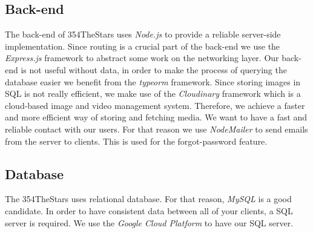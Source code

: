 \documentclass[11pt]{article}
\newcounter{use case ID}
\newcounter{req ID}
\begin{document}
    \subsection{Back-end}
        The back-end of 354TheStars uses \textit{Node.js} to provide a reliable server-side implementation. Since routing is a crucial part of the back-end we use the \textit{Express.js} framework to abstract some work on the networking layer. 
        Our back-end is not useful without data, in order to make the process of querying the database easier we benefit from the \textit{typeorm} framework.
        Since storing images in SQL is not really efficient, we make use of the \textit{Cloudinary} framework which is a cloud-based image and video management system. Therefore, we achieve a faster and more efficient way of storing and fetching media.
        We want to have a fast and reliable contact with our users. For that reason we use \textit{NodeMailer} to send emails from the server to clients. This is used for the forgot-password feature.
    \subsection{Database}
        The 354TheStars uses relational database. For that reason, \textit{MySQL} is a good candidate. In order to have consistent data between all of your clients, a SQL server is required. We use the \textit{Google Cloud Platform} to have our SQL server.
\end{document}
